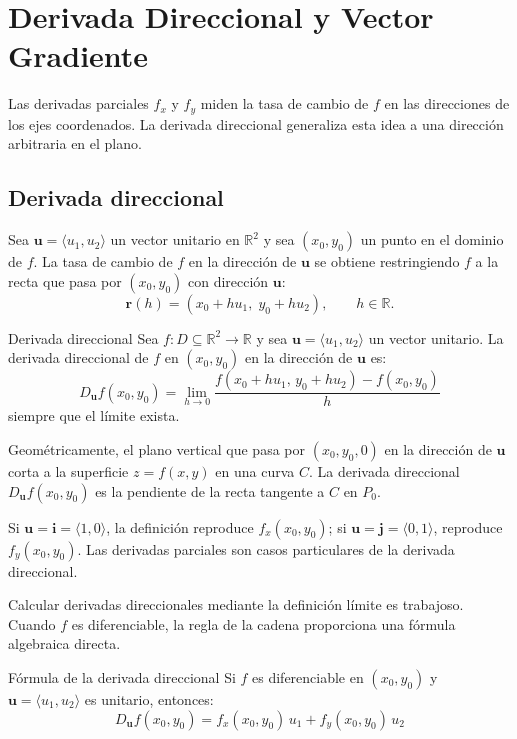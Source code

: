 \section{Derivada Direccional y Vector Gradiente}

Las derivadas parciales $f_x$ y $f_y$ miden la tasa de cambio de $f$ en las direcciones de los ejes coordenados. La derivada direccional generaliza esta idea a una dirección arbitraria en el plano.

\subsection{Derivada direccional}

Sea $\mathbf{u} = \langle u_1, u_2 \rangle$ un vector unitario en $\mathbb{R}^2$ y sea $(x_0, y_0)$ un punto en el dominio de $f$. La tasa de cambio de $f$ en la dirección de $\mathbf{u}$ se obtiene restringiendo $f$ a la recta que pasa por $(x_0, y_0)$ con dirección $\mathbf{u}$:
\[
\mathbf{r}(h) = (x_0 + hu_1,\; y_0 + hu_2), \qquad h \in \mathbb{R}.
\]

\begin{mydefinition}{Derivada direccional}
Sea $f: D \subseteq \mathbb{R}^2 \to \mathbb{R}$ y sea $\mathbf{u} = \langle u_1, u_2 \rangle$ un vector unitario. La derivada direccional de $f$ en $(x_0, y_0)$ en la dirección de $\mathbf{u}$ es:
\[
D_{\mathbf{u}} f(x_0, y_0)
= \lim_{h \to 0} \frac{f(x_0 + hu_1,\, y_0 + hu_2) - f(x_0, y_0)}{h}
\]
siempre que el límite exista.
\end{mydefinition}

Geométricamente, el plano vertical que pasa por $(x_0, y_0, 0)$ en la dirección de $\mathbf{u}$ corta a la superficie $z = f(x,y)$ en una curva $C$. La derivada direccional $D_{\mathbf{u}} f(x_0, y_0)$ es la pendiente de la recta tangente a $C$ en $P_0$.

Si $\mathbf{u} = \mathbf{i} = \langle 1, 0 \rangle$, la definición reproduce $f_x(x_0, y_0)$; si $\mathbf{u} = \mathbf{j} = \langle 0, 1 \rangle$, reproduce $f_y(x_0, y_0)$. Las derivadas parciales son casos particulares de la derivada direccional.

Calcular derivadas direccionales mediante la definición límite es trabajoso. Cuando $f$ es diferenciable, la regla de la cadena proporciona una fórmula algebraica directa.

\begin{mytheorem}{Fórmula de la derivada direccional}
Si $f$ es diferenciable en $(x_0, y_0)$ y $\mathbf{u} = \langle u_1, u_2 \rangle$ es unitario, entonces:
\[
D_{\mathbf{u}} f(x_0, y_0) = f_x(x_0, y_0)\, u_1 + f_y(x_0, y_0)\, u_2
\]
\end{mytheorem}

